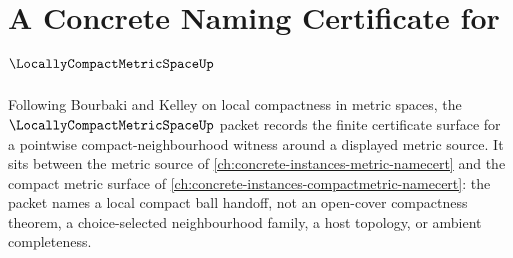 \chapter{A Concrete Naming Certificate for $\LocallyCompactMetricSpaceUp$}
\label{ch:concrete-instances-locally-compact-metric-space-namecert}

Following Bourbaki and Kelley on local compactness in metric spaces, the $\LocallyCompactMetricSpaceUp$ packet records the finite certificate surface for a pointwise compact-neighbourhood witness around a displayed metric source. It sits between the metric source of \autoref{ch:concrete-instances-metric-namecert} and the compact metric surface of \autoref{ch:concrete-instances-compactmetric-namecert}: the packet names a local compact ball handoff, not an open-cover compactness theorem, a choice-selected neighbourhood family, a host topology, or ambient completeness.

